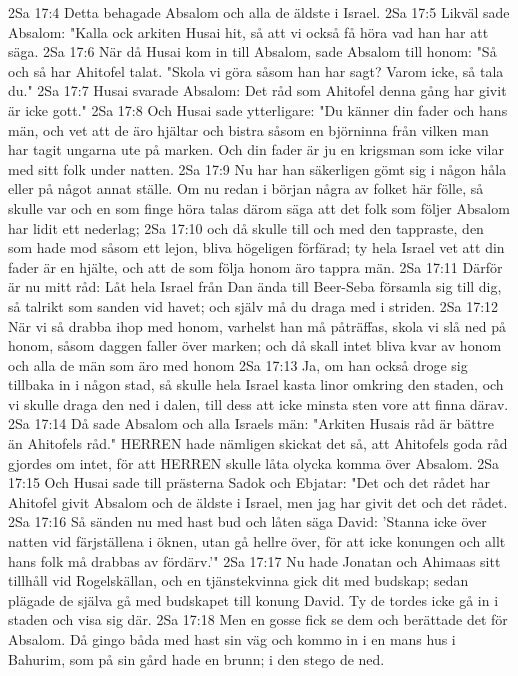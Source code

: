 2Sa 17:4  Detta behagade Absalom och alla de äldste i Israel.
2Sa 17:5  Likväl sade Absalom: "Kalla ock arkiten Husai hit, så att vi också få höra vad han har att säga.
2Sa 17:6  När då Husai kom in till Absalom, sade Absalom till honom: "Så och så har Ahitofel talat. "Skola vi göra såsom han har sagt? Varom icke, så tala du."
2Sa 17:7  Husai svarade Absalom: Det råd som Ahitofel denna gång har givit är icke gott."
2Sa 17:8  Och Husai sade ytterligare: "Du känner din fader och hans män, och vet att de äro hjältar och bistra såsom en björninna från vilken man har tagit ungarna ute på marken. Och din fader är ju en krigsman som icke vilar med sitt folk under natten.
2Sa 17:9  Nu har han säkerligen gömt sig i någon håla eller på något annat ställe. Om nu redan i början några av folket här fölle, så skulle var och en som finge höra talas därom säga att det folk som följer Absalom har lidit ett nederlag;
2Sa 17:10  och då skulle till och med den tappraste, den som hade mod såsom ett lejon, bliva högeligen förfärad; ty hela Israel vet att din fader är en hjälte, och att de som följa honom äro tappra män.
2Sa 17:11  Därför är nu mitt råd: Låt hela Israel från Dan ända till Beer-Seba församla sig till dig, så talrikt som sanden vid havet; och själv må du draga med i striden.
2Sa 17:12  När vi så drabba ihop med honom, varhelst han må påträffas, skola vi slå ned på honom, såsom daggen faller över marken; och då skall intet bliva kvar av honom och alla de män som äro med honom
2Sa 17:13  Ja, om han också droge sig tillbaka in i någon stad, så skulle hela Israel kasta linor omkring den staden, och vi skulle draga den ned i dalen, till dess att icke minsta sten vore att finna därav.
2Sa 17:14  Då sade Absalom och alla Israels män: "Arkiten Husais råd är bättre än Ahitofels råd." HERREN hade nämligen skickat det så, att Ahitofels goda råd gjordes om intet, för att HERREN skulle låta olycka komma över Absalom.
2Sa 17:15  Och Husai sade till prästerna Sadok och Ebjatar: "Det och det rådet har Ahitofel givit Absalom och de äldste i Israel, men jag har givit det och det rådet.
2Sa 17:16  Så sänden nu med hast bud och låten säga David: 'Stanna icke över natten vid färjställena i öknen, utan gå hellre över, för att icke konungen och allt hans folk må drabbas av fördärv.'"
2Sa 17:17  Nu hade Jonatan och Ahimaas sitt tillhåll vid Rogelskällan, och en tjänstekvinna gick dit med budskap; sedan plägade de själva gå med budskapet till konung David. Ty de tordes icke gå in i staden och visa sig där.
2Sa 17:18  Men en gosse fick se dem och berättade det för Absalom. Då gingo båda med hast sin väg och kommo in i en mans hus i Bahurim, som på sin gård hade en brunn; i den stego de ned.
